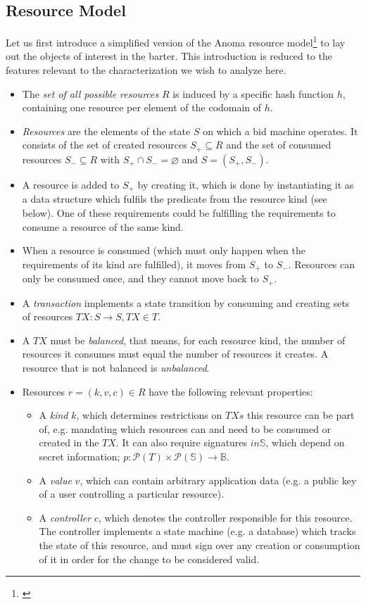 \subsection{Resource Model}
Let us first introduce a simplified version of the Anoma resource model\footnote{\cite{khalniyazova_2024_10498991}} to lay out the objects of interest in the barter. This introduction is reduced to the features relevant to the characterization we wish to analyze here.
\begin{itemize} 
    \item The \textit{set of all possible resources} $R$ is induced by a specific hash function $h$, containing one resource per element of the codomain of $h$.
    \item \textit{Resources} are the elements of the state $S$ on which a bid machine operates. It consists of the set of created resources $S_+ \subseteq R $ and the set of consumed resources $S_- \subseteq R$ with $S_+ \cap S_- = \varnothing$ and $S = (S_+, S_-)$. %
    \item A resource is added to $S_+$ by creating it, which is done by instantiating it as a data structure which fulfils the predicate from the resource kind (see below). One of these requirements could be fulfilling the requirements to consume a resource of the same kind.
    \item When a resource is consumed (which must only happen when the requirements of its kind are fulfilled), it moves from $S_+$ to $S_-$. Resources can only be consumed once, and they cannot move back to $S_+$. 
    \item A \textit{transaction} implements a state transition by consuming and creating sets of resources $TX: S \to S, TX \in T$.
    \item A $TX$ must be \textit{balanced}, that means, for each resource kind, the number of resources it consumes must equal the number of resources it creates. A resource that is not balanced is \textit{unbalanced}. 
    \item Resources $r = (k, v, c) \in R$ have the following relevant properties:
    \begin{itemize} 
        \item A \textit{kind} $k$, which determines restrictions on $TXs$ this resource can be part of, e.g. mandating which resources can and need to be consumed or created in the $TX$.  It can also require signatures $in \mathbb{S}$, which depend on secret information; $p: \mathcal{P}(T) \times  \mathcal{P}(\mathbb{S}) \to \mathbb{B}$.
        \item A \textit{value} $v$, which can contain arbitrary application data (e.g. a public key of a user controlling a particular resource).
        \item A \textit{controller} $c$, which denotes the controller responsible for this resource. The controller implements a state machine (e.g. a database) which tracks the state of this resource, and must sign over any creation or consumption of it in order for the change to be considered valid.
    \end{itemize}
\end{itemize}

